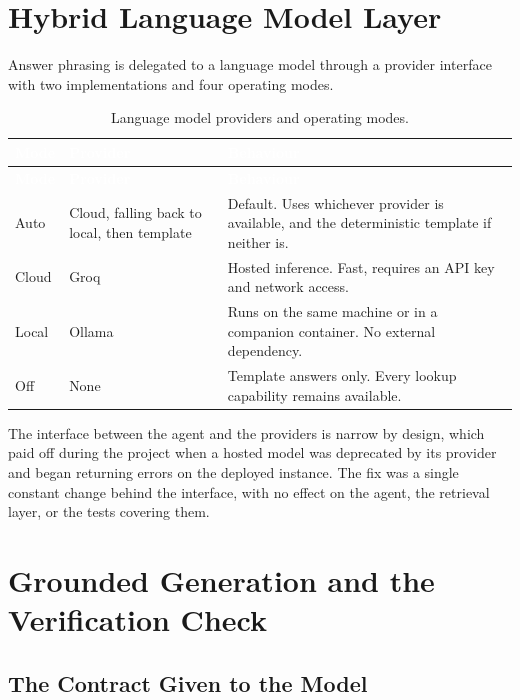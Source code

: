 \section{Hybrid Language Model Layer}

Answer phrasing is delegated to a language model through a provider interface with two implementations and four operating modes.

\begin{longtable}{|p{}|p{}|p{}|}
\caption{Language model providers and operating modes.}\label{tab:llm}\\
\hline
\rowcolor{thesisgreen}\textcolor{white}{\textbf{Mode}} & \textcolor{white}{\textbf{Provider}} & \textcolor{white}{\textbf{Behaviour}} \\
\hline
\endfirsthead
\hline
\rowcolor{thesisgreen}\textcolor{white}{\textbf{Mode}} & \textcolor{white}{\textbf{Provider}} & \textcolor{white}{\textbf{Behaviour}} \\
\hline
\endhead
Auto & Cloud, falling back to local, then template & Default. Uses whichever provider is available, and the deterministic template if neither is. \\ \hline
Cloud & Groq & Hosted inference. Fast, requires an API key and network access. \\ \hline
Local & Ollama & Runs on the same machine or in a companion container. No external dependency. \\ \hline
Off & None & Template answers only. Every lookup capability remains available. \\ \hline
\end{longtable}

The interface between the agent and the providers is narrow by design, which paid off during the project when a hosted model was deprecated by its provider and began returning errors on the deployed instance. The fix was a single constant change behind the interface, with no effect on the agent, the retrieval layer, or the tests covering them.

\section{Grounded Generation and the Verification Check}

\subsection{The Contract Given to the Model}

